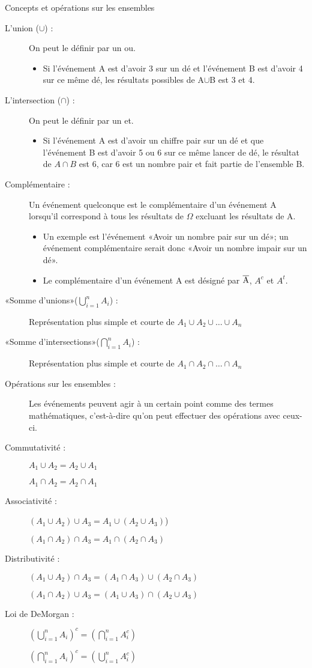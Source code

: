 \documentclass[10pt, french]{article}
\begin{document}
\begin{multicols*}{3}
\begin{probch2}{Concepts et opérations sur les ensembles}
\begin{description}
  \item[L'union ({$\cup$}) :] On peut le définir par un ou. 
  	\begin{itemize}
  	\item	Si l'événement A est d'avoir 3 sur un dé et l'événement B est d'avoir 4 sur ce même dé, les résultats possibles de A{$\cup$}B est 3 et 4.
  	\end{itemize}
  \item[L'intersection ({$\cap$}) :] On peut le définir par un et. 
  	\begin{itemize}
  	\item	Si l'événement A est d'avoir un chiffre pair sur un dé et que l'événement B est d'avoir 5 ou 6 sur ce même lancer de dé, le résultat de $A \cap B$ est 6, car 6 est un nombre pair et fait partie de l'ensemble B. 
  	\end{itemize}
  \item[Complémentaire :] Un événement quelconque est le complémentaire d'un événement A lorsqu'il correspond à tous les résultats de $\Omega$ excluant les résultats de A. 
  	\begin{itemize}
  	\item	Un exemple est l'événement «Avoir un nombre pair sur un dé»; un événement complémentaire serait donc «Avoir un nombre impair sur un dé». 
  	\item	Le complémentaire d'un événement A est désigné par {$\overline{\rm A}$}, $A^{c}$ et $A^{t}$.
  	\end{itemize}
  \item[«Somme d'unions»($\bigcup_{i=1}^{n} A_i$) :] Représentation plus simple et courte de $A_1 \cup A_2 \cup \dots \cup A_n$
  \item[«Somme d'intersections»($\bigcap_{i=1}^{n} A_i$) :] Représentation plus simple et courte de $A_1 \cap A_2 \cap \dots \cap A_n$
  \item[Opérations sur les ensembles :] Les événements peuvent agir à un certain point comme des termes mathématiques, c'est-à-dire qu'on peut effectuer des opérations avec ceux-ci.
  \item[Commutativité :] $A_1	\cup	A_2	=	A_2 \cup A_1$
  \item[] $A_1	\cap	A_2	=	A_2 \cap A_1$
  \item[Associativité :] $(A_1 \cup A_2)	\cup A_3	=	A_1 \cup		(A_2 \cup A_3)$)
  \item[] $(A_1 \cap A_2)	\cap A_3	=	A_1 \cap		(A_2 \cap A_3)$
  \item[Distributivité :] $(A_1 \cup A_2)	\cap A_3 = (A_1 \cap A_3) \cup (A_2 \cap A_3)$
  \item[] $(A_1 \cap A_2)	\cup A_3 = (A_1 \cup A_3) \cap (A_2 \cup A_3)$
  \item[Loi de DeMorgan :] $(\bigcup_{i = 1}^{n} A_{i})^{c} = (\bigcap_{i=1}^{n} A_i^{c})$
  \item[] $(\bigcap_{i = 1}^{n} A_{i})^{c} = (\bigcup_{i=1}^{n} A_i^{c})$
\end{description}
\end{probch2}


\end{multicols*}
\end{document}
